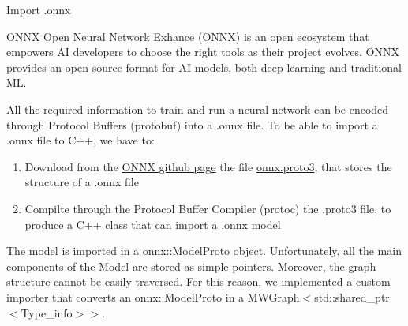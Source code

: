 \begin{frame}[allowframebreaks]{Import .onnx}
    \begin{block}{ONNX}
    Open Neural Network Exhance (ONNX) is an open ecosystem that empowers AI developers to choose the right tools as their project evolves. ONNX provides an open source format for AI models, both deep learning and traditional ML. 
    \end{block}
    
    All the required information to train and run a neural network can be encoded through Protocol Buffers (protobuf) into a .onnx file. To be able to import a .onnx file to C++, we have to:
    \begin{enumerate}
        \item Download from the \href{https://github.com/onnx/onnx}{ONNX github page} the file \href{https://github.com/onnx/onnx/blob/main/onnx/onnx.proto3}{onnx.proto3}, that stores the structure of a .onnx file
        \item Compilte through the Protocol Buffer Compiler (protoc) the .proto3 file, to produce a C++ class that can import a .onnx model
    \end{enumerate}
    
    \framebreak
    
    The model is imported in a onnx::ModelProto object. Unfortunately, all the main components of the Model are stored as simple pointers. Moreover, the graph structure cannot be easily traversed. For this reason, we implemented a custom importer that converts an onnx::ModelProto in a MWGraph$<$std::shared\_ptr$<$Type\_info$>>$.
    
\end{frame}
